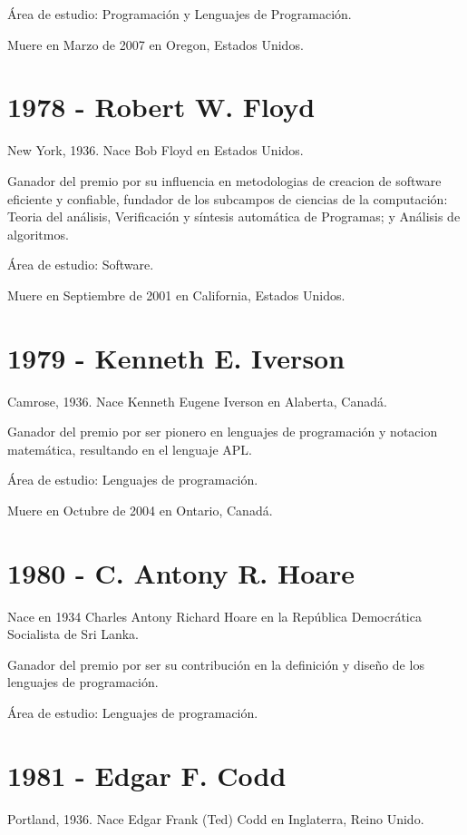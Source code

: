 \documentclass[a4paper, 11pt]{article}
\begin{document}
\noindent Área de estudio: Programación y Lenguajes de Programación.

\noindent Muere en Marzo de 2007 en Oregon, Estados Unidos.
\newline

\section*{1978 - Robert W. Floyd}
\noindent New York, 1936. Nace Bob Floyd en Estados Unidos.

\noindent Ganador del premio por su influencia en metodologias de creacion de software eficiente y confiable, fundador de los subcampos de ciencias de la computación: Teoria del análisis, Verificación y síntesis automática de Programas; y Análisis de algoritmos. 

\noindent Área de estudio: Software.

\noindent Muere en Septiembre de 2001 en California, Estados Unidos.
\newline

\section*{1979 - Kenneth E. Iverson}
\noindent Camrose, 1936. Nace Kenneth Eugene Iverson en Alaberta, Canadá.

\noindent Ganador del premio por ser pionero en lenguajes de programación y notacion matemática, resultando en el lenguaje APL.

\noindent Área de estudio: Lenguajes de programación.

\noindent Muere en Octubre de 2004 en Ontario, Canadá.
\newline

\section*{1980 - C. Antony R. Hoare}
\noindent Nace en 1934 Charles Antony Richard Hoare en la República Democrática Socialista de Sri Lanka.

\noindent Ganador del premio por ser su contribución en la definición y diseño de los lenguajes de programación.

\noindent Área de estudio: Lenguajes de programación.
\newline

\section*{1981 - Edgar F. Codd}
\noindent Portland, 1936. Nace Edgar Frank (Ted) Codd en Inglaterra, Reino Unido.
\end{document}
